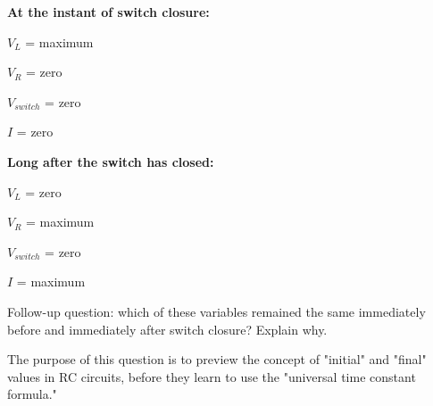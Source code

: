 \noindent
{\bf At the instant of switch closure:}

$V_{L}$ = maximum

$V_{R}$ = zero

$V_{switch}$ = zero

$I$ = zero

\vskip 10pt
\goodbreak

\noindent
{\bf Long after the switch has closed:}

$V_{L}$ = zero

$V_{R}$ = maximum

$V_{switch}$ = zero

$I$ = maximum

\vskip 10pt

Follow-up question: which of these variables remained the same immediately before and immediately after switch closure?  Explain why.







The purpose of this question is to preview the concept of "initial" and "final" values in RC circuits, before they learn to use the "universal time constant formula."




